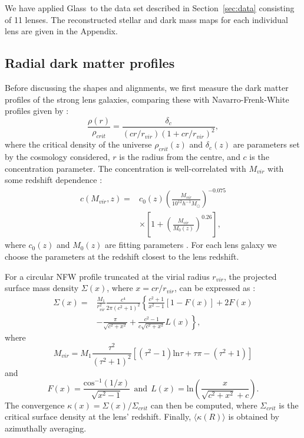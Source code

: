 \documentclass[useAMS,usenatbib]{mn2e}
\def\Glass{{\sc Glass}}
\begin{document}
We have applied \Glass\ to the data set described in Section~\ref{sec:data} consisting of 11 lenses. The reconstructed stellar and dark mass maps for each individual lens are given in the Appendix.

\subsection{Radial dark matter profiles}\label{sec:radialprofiles}
Before discussing the shapes and alignments, we first measure the dark matter profiles of the strong lens galaxies, comparing these with Navarro-Frenk-White profiles \citep[NFW;][]{1996ApJ...462..563N} given by \citep{2011ApJ...740..102K}:
\begin{equation}\label{eq:nfw}
   \frac{\rho(r)}{\rho_{crit}} = \frac{\delta_{c}}{(cr/r_{vir})(1+cr/r_{vir})^2},
\end{equation}
where the critical density of the universe $\rho_{crit}(z)$ and $\delta_{c}(z)$ are parameters set by the cosmology considered, $r$ is the radius from the centre, and $c$ is the concentration parameter. The concentration is well-correlated with $M_{vir}$ with some redshift dependence \citep{2011ApJ...740..102K}: 
\begin{equation}\label{eq:concentration}
 \begin{split}
   c(M_{vir}, z) = & c_{0}(z)\left(\frac{M_{vir}}{10^{12}h^{-1}M_{\odot}}\right)^{-0.075} \\ & \times \left[1+\left(\frac{M_{vir}}{M_{0}(z)}\right)^{0.26}\right],
 \end{split}
\end{equation}
where $c_{0}(z)$ and $M_{0}(z)$ are fitting parameters \citep[see Table 3 of][]{2011ApJ...740..102K}. For each lens galaxy we choose the parameters at the redshift closest to the lens redshift.

For a circular NFW profile truncated at the virial radius $r_{vir}$, the projected surface mass density $\Sigma(x)$, where $x = cr/r_{vir}$, can be expressed as \citep{2009JCAP...01..015B}:
\begin{equation}
 \begin{aligned}
  \Sigma(x) = & \frac{M_1}{r_{vir}^2}\frac{c^4}{2\pi(c^2+1)^2}\left\{\frac{c^2+1}{x^2-1}[1-F(x)]+2F(x) \right. \\
  & \left. -\frac{\pi}{\sqrt{c^2+x^2}}+\frac{c^2-1}{c\sqrt{c^2+x^2}}L(x)\right\},
 \end{aligned}
\end{equation}
where
\begin{equation}
  M_{vir} = M_{1} \frac{\tau^2}{(\tau^2+1)^2}\left[(\tau^2-1)\mathrm{ln}\tau+\tau\pi-(\tau^2+1)\right]
\end{equation}
and
\begin{equation}
  F(x) = \frac{\mathrm{cos}^{-1}(1/x)}{\sqrt{x^2-1}} \ \ \mathrm{and} \ \ L(x) = \mathrm{ln}\left(\frac{x}{\sqrt{c^2+x^2}+c}\right).
\end{equation}
The convergence $\kappa(x)=\Sigma(x)/\Sigma_{crit}$ can then be computed, where $\Sigma_{crit}$ is the critical surface density at the lens' redshift. Finally, $\langle\kappa(R)\rangle$ is obtained by azimuthally averaging.
\end{document}
